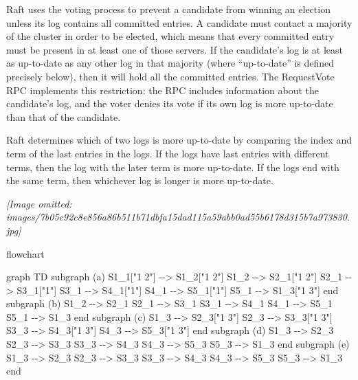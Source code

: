 \documentclass[
]{article}
\newenvironment{Shaded}{}{}
\newcommand{\NormalTok}[1]{#1}
\begin{document}
Raft uses the voting process to prevent a candidate from winning an
election unless its log contains all committed entries. A candidate must
contact a majority of the cluster in order to be elected, which means
that every committed entry must be present in at least one of those
servers. If the candidate's log is at least as up-to-date as any other
log in that majority (where ``up-to-date'' is defined precisely below),
then it will hold all the committed entries. The RequestVote RPC
implements this restriction: the RPC includes information about the
candidate's log, and the voter denies its vote if its own log is more
up-to-date than that of the candidate.

Raft determines which of two logs is more up-to-date by comparing the
index and term of the last entries in the logs. If the logs have last
entries with different terms, then the log with the later term is more
up-to-date. If the logs end with the same term, then whichever log is
longer is more up-to-date.

\textit{[Image omitted: images/7b05c92c8e856a86b511b71dbfa15dad115a59abb0ad55b6178d315b7a973830.jpg]}

flowchart

\begin{Shaded}
\begin{Highlighting}[]
\NormalTok{graph TD}
\NormalTok{    subgraph (a)}
\NormalTok{        S1\_1["1 2"] {-}{-}\textgreater{} S1\_2["1 2"]}
\NormalTok{        S1\_2 {-}{-}\textgreater{} S2\_1["1 2"]}
\NormalTok{        S2\_1 {-}{-}\textgreater{} S3\_1["1"]}
\NormalTok{        S3\_1 {-}{-}\textgreater{} S4\_1["1"]}
\NormalTok{        S4\_1 {-}{-}\textgreater{} S5\_1["1"]}
\NormalTok{        S5\_1 {-}{-}\textgreater{} S1\_3["1 3"]}
\NormalTok{    end}
\NormalTok{    subgraph (b)}
\NormalTok{        S1\_2 {-}{-}\textgreater{} S2\_1}
\NormalTok{        S2\_1 {-}{-}\textgreater{} S3\_1}
\NormalTok{        S3\_1 {-}{-}\textgreater{} S4\_1}
\NormalTok{        S4\_1 {-}{-}\textgreater{} S5\_1}
\NormalTok{        S5\_1 {-}{-}\textgreater{} S1\_3}
\NormalTok{    end}
\NormalTok{    subgraph (c)}
\NormalTok{        S1\_3 {-}{-}\textgreater{} S2\_3["1 3"]}
\NormalTok{        S2\_3 {-}{-}\textgreater{} S3\_3["1 3"]}
\NormalTok{        S3\_3 {-}{-}\textgreater{} S4\_3["1 3"]}
\NormalTok{        S4\_3 {-}{-}\textgreater{} S5\_3["1 3"]}
\NormalTok{    end}
\NormalTok{    subgraph (d)}
\NormalTok{        S1\_3 {-}{-}\textgreater{} S2\_3}
\NormalTok{        S2\_3 {-}{-}\textgreater{} S3\_3}
\NormalTok{        S3\_3 {-}{-}\textgreater{} S4\_3}
\NormalTok{        S4\_3 {-}{-}\textgreater{} S5\_3}
\NormalTok{        S5\_3 {-}{-}\textgreater{} S1\_3}
\NormalTok{    end}
\NormalTok{    subgraph (e)}
\NormalTok{        S1\_3 {-}{-}\textgreater{} S2\_3}
\NormalTok{        S2\_3 {-}{-}\textgreater{} S3\_3}
\NormalTok{        S3\_3 {-}{-}\textgreater{} S4\_3}
\NormalTok{        S4\_3 {-}{-}\textgreater{} S5\_3}
\NormalTok{        S5\_3 {-}{-}\textgreater{} S1\_3}
\NormalTok{    end}
\end{Highlighting}
\end{Shaded}
\end{document}
